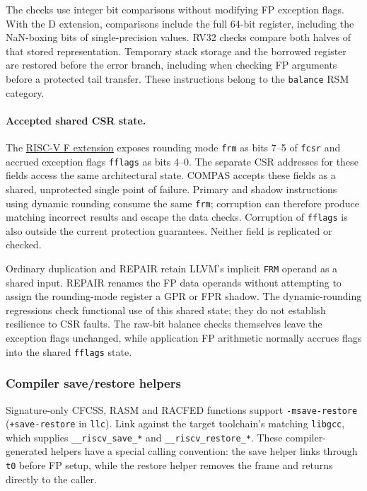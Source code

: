 The checks use integer bit comparisons without modifying FP exception flags.
With the D extension, comparisons include the full 64-bit register, including
the NaN-boxing bits of single-precision values. RV32 checks compare both halves
of that stored representation.
Temporary stack storage and the borrowed register are restored before the
error branch, including when checking FP arguments before a protected tail
transfer. These instructions belong to the \texttt{balance} RSM category.

\paragraph{Accepted shared CSR state.}
The \href{https://docs.riscv.org/reference/isa/v20260120/unpriv/f-st-ext.html}{RISC-V F extension}
exposes rounding mode \texttt{frm} as bits 7--5 of \texttt{fcsr} and accrued
exception flags \texttt{fflags} as bits 4--0. The separate CSR addresses for
these fields access the same architectural state.
COMPAS accepts these fields as a shared, unprotected single point of failure.
Primary and shadow instructions using dynamic rounding consume the same
\texttt{frm}; corruption can therefore produce matching incorrect results
and escape the data checks. Corruption of \texttt{fflags} is also outside
the current protection guarantees. Neither field is replicated or checked.

Ordinary duplication and REPAIR retain LLVM's implicit \texttt{FRM} operand
as a shared input. REPAIR renames the FP data operands without attempting to
assign the rounding-mode register a GPR or FPR shadow.
The dynamic-rounding regressions check functional use of this shared state;
they do not establish resilience to CSR faults. The raw-bit balance checks
themselves leave the exception flags unchanged, while application FP arithmetic
normally accrues flags into the shared \texttt{fflags} state.

\subsubsection{Compiler save/restore helpers}
Signature-only CFCSS, RASM and RACFED functions support
\texttt{-msave-restore} (\texttt{+save-restore} in \texttt{llc}). Link against
the target toolchain's matching \texttt{libgcc}, which supplies
\texttt{\_\_riscv\_save\_*} and \texttt{\_\_riscv\_restore\_*}.
These compiler-generated helpers have a special calling convention: the save
helper links through \texttt{t0} before FP setup, while the restore helper
removes the frame and returns directly to the caller.

